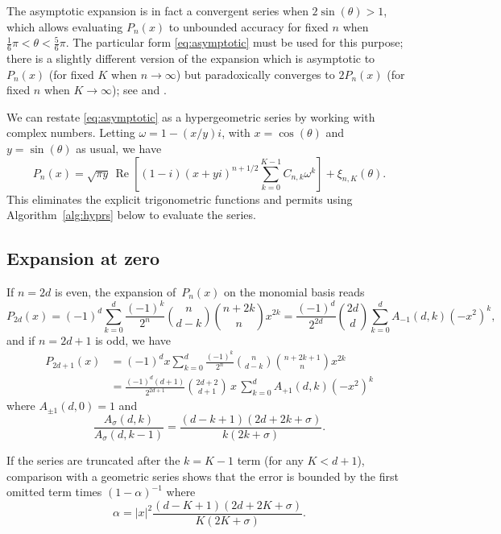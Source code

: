 \documentclass{siamart0216}
\begin{document}
The asymptotic expansion is in fact a convergent series
when $2 \sin(\theta) > 1$, which allows evaluating $P_n(x)$ to unbounded
accuracy for fixed $n$ when $\tfrac{1}{6}\pi < \theta < \tfrac{5}{6} \pi$.
The particular form \eqref{eq:asymptotic}
must be used for this purpose; there is a slightly different version of the expansion
which is asymptotic to $P_n(x)$ (for fixed $K$ when $n \to \infty$)
but paradoxically
converges to $2 P_n(x)$ (for fixed $n$ when $K \to \infty$); see \cite{Olver1997} and \cite{Olver2010}.

We can restate \eqref{eq:asymptotic} as a hypergeometric series
by working with complex numbers.
Letting $\omega = 1 - (x/y) i$, with $x = \cos(\theta)$ and $y =
\sin(\theta)$ as usual, we have
\begin{equation}
\label{eq:asymptoticcomplex}
P_n(x) = \sqrt{\pi y} \, \operatorname{Re}\left[
(1-i) (x+y i)^{n+1/2}
\sum_{k=0}^{K-1} C_{n,k} \omega^k\right] + \xi_{n,K}(\theta).
\end{equation}
This eliminates the explicit trigonometric functions and permits using
Algorithm~\ref{alg:hyprs} below to evaluate the series.

\subsection{Expansion at zero}

\label{sec:series-zero}

If $n = 2d$ is even, the expansion of $P_n(x)$ on the monomial basis
reads
$$P_{2d}(x) = (-1)^d \sum_{k=0}^d \frac{(-1)^k}{2^n} {n \choose d-k} {n+2k \choose n} x^{2k} = \frac{(-1)^d}{2^{2d}} {2d \choose d} \sum_{k=0}^d A_{-1}(d,k) (-x^2)^k,$$
and if $n = 2d+1$ is odd, we have
\begin{align*}
P_{2d+1}(x) &= (-1)^d x \sum_{k=0}^d \frac{(-1)^k}{2^n} {n \choose d-k} {n+2k+1 \choose n} x^{2k} \\
&= \frac{(-1)^d (d+1)}{2^{2d+1}} {2d+2 \choose d+1} \,x\, \sum_{k=0}^d A_{+1}(d,k) (-x^2)^k
\end{align*}
where $A_{\pm 1}(d,0) = 1$ and
$$\frac{A_{\sigma}(d,k)}{A_{\sigma}(d,k-1)} = \frac{(d-k+1) (2d+2k+\sigma)}{k (2k+\sigma)}.$$

If the series are truncated after the $k = K - 1$ term
(for any $K < d + 1$), comparison with a geometric series
shows that the error is bounded by the first
omitted term times $(1-\alpha)^{-1}$
where
\begin{equation}
\label{eq:truncerr1}
\alpha = |x|^2 \frac{(d-K+1)(2d+2K+\sigma)}{K (2K+\sigma)}.
\end{equation}
\end{document}

